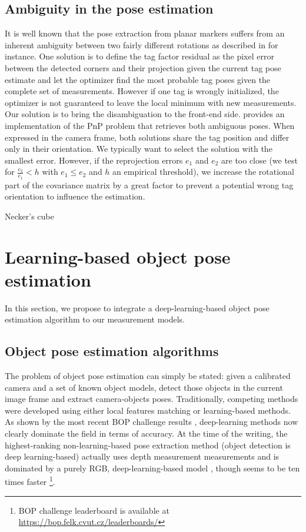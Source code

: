 \subsection{Ambiguity in the pose estimation}
It is well known that the pose extraction from planar markers suffers from an inherent ambiguity between two fairly different rotations as described in 
\cite{8206468} for instance. One solution is to define the tag factor residual as the pixel error between the detected corners and their projection given the
current tag pose estimate and let the optimizer find the most probable tag poses given the complete set of measurements. However if one tag is wrongly initialized, 
the optimizer is not guaranteed to leave the local minimum with new measurements. Our solution is to bring the disambiguation to the front-end side.
\cite{collins2014infinitesimal} provides an implementation of the PnP problem that retrieves both ambiguous poses. When expressed in the camera frame, 
both solutions share the tag position and differ only in their orientation. We typically want to select the solution with the smallest error. 
However, if the reprojection errors $e_1$ and $e_2$ are too close (we test for $\tfrac{e_2}{e_1} < h$ with $e_1 \leq e_2$ and $h$ an empirical threshold), 
we increase the rotational part of the covariance matrix by a great factor to prevent a potential wrong tag orientation to influence the estimation.


Necker's cube









%
%
%
%
\section{Learning-based object pose estimation}
In this section, we propose to integrate a deep-learning-based object pose estimation algorithm \cite{labbe2020cosypose} to our measurement models. 


\subsection{Object pose estimation algorithms}
\label{sec:object_pose_est}
The problem of object pose estimation can simply be stated: given a calibrated camera and a set of known object models, detect those objects in the current image 
frame and extract camera-objects poses. Traditionally, competing methods were developed using either local features matching or learning-based methods.
As shown by the most recent BOP challenge results \cite{hodan2020bop}, deep-learning methods now clearly dominate the field in terms of accuracy. 
At the time of the writing, the highest-ranking non-learning-based pose extraction method \cite{konig2020hybrid} (object detection is deep learning-based) 
actually uses depth measurement measurements and is dominated by a purely RGB, deep-learning-based model \cite{haugaard2021surfemb}, though \cite{konig2020hybrid} 
seems to be ten times faster \footnote{BOP challenge leaderboard is available at \url{https://bop.felk.cvut.cz/leaderboards/}}.

